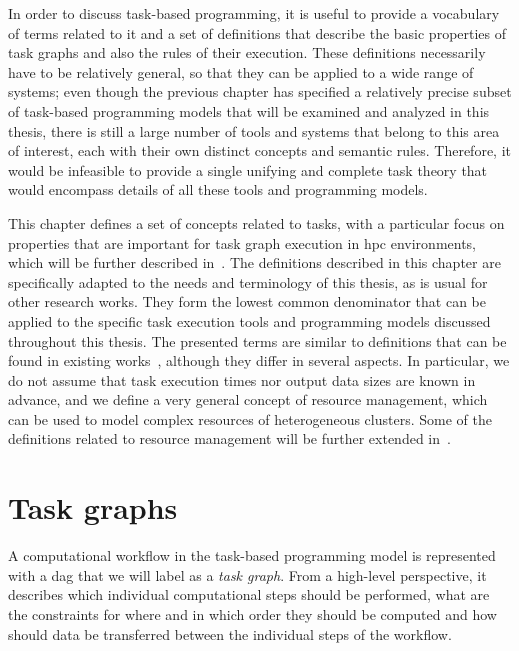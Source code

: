 In order to discuss task-based programming, it is useful to provide a vocabulary of terms related
to it and a set of definitions that describe the basic properties of task graphs and also the rules
of their execution. These definitions necessarily have to be relatively general, so that they can
be applied to a wide range of systems; even though the previous chapter has specified a relatively
precise subset of task-based programming models that will be examined and analyzed in this thesis,
there is still a large number of tools and systems that belong to this area of interest, each with
their own distinct concepts and semantic rules. Therefore, it would be infeasible to provide a
single unifying and complete task theory that would encompass details of all these tools and
programming models.

This chapter defines a set of concepts related to tasks, with a particular focus on properties that
are important for task graph execution in \gls{hpc} environments, which will be
further described in~. The definitions described in this chapter are
specifically adapted to the needs and terminology of this thesis, as is usual for other research
works. They form the lowest common denominator that can be applied to the specific task execution
tools and programming models discussed throughout this thesis. The presented terms are similar to
definitions that can be found in existing works~\cite{task_scheduling,hagras2003static,wang2018list}, although they differ in
several aspects. In particular, we do not assume that task execution times nor output data sizes
are known in advance, and we define a very general concept of resource management, which can be
used to model complex resources of heterogeneous clusters. Some of the definitions related to
resource management will be further extended in~.

\section{Task graphs}
\label{sec:task-graphs}
A computational workflow in the task-based programming model is represented with a
\gls{dag} that we will label as a \emph{task graph}. From a high-level
perspective, it describes which individual computational steps should be performed, what are the
constraints for where and in which order they should be computed and how should data be transferred
between the individual steps of the workflow.


